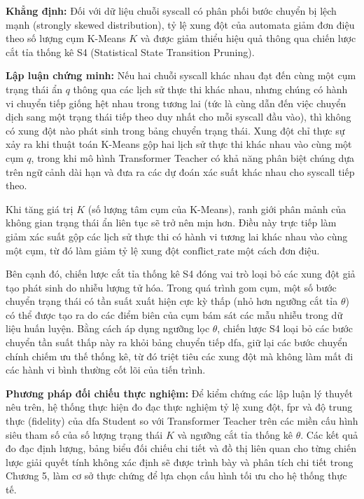 \documentclass[../main.tex]{subfiles}
\begin{document}
\textbf{Khẳng định:} Đối với dữ liệu chuỗi \gls{syscall} có phân phối bước
chuyển bị lệch mạnh (strongly skewed distribution), tỷ lệ xung đột
của automata giảm đơn điệu theo số lượng cụm K-Means $K$ và được giảm
thiểu hiệu quả thông qua chiến lược cắt tỉa thống kê S4 (Statistical
State Transition Pruning).

\textbf{Lập luận chứng minh:} Nếu hai chuỗi \gls{syscall} khác nhau đạt đến
cùng một cụm trạng thái ẩn $q$ thông qua các lịch sử thực thi khác
nhau, nhưng chúng có hành vi chuyển tiếp giống hệt nhau trong tương
lai (tức là cùng dẫn đến việc chuyển dịch sang một trạng thái tiếp
theo duy nhất cho mỗi \gls{syscall} đầu vào), thì không có xung đột nào
phát sinh trong bảng chuyển trạng thái. Xung đột chỉ thực sự xảy ra
khi thuật toán K-Means gộp hai lịch sử thực thi khác nhau vào cùng
một cụm $q$, trong khi mô hình Transformer Teacher có khả năng phân
biệt chúng dựa trên ngữ cảnh dài hạn và đưa ra các dự đoán xác suất
khác nhau cho \gls{syscall} tiếp theo.

Khi tăng giá trị $K$ (số lượng tâm cụm của K-Means), ranh giới phân
mảnh của không gian trạng thái ẩn liên tục sẽ trở nên mịn hơn. Điều
này trực tiếp làm giảm xác suất gộp các lịch sử thực thi có hành vi
tương lai khác nhau vào cùng một cụm, từ đó làm giảm tỷ lệ xung đột
$\text{conflict\_rate}$ một cách đơn điệu.

Bên cạnh đó, chiến lược cắt tỉa thống kê S4 đóng vai trò loại bỏ các
xung đột giả tạo phát sinh do nhiễu lượng tử hóa. Trong quá trình gom
cụm, một số bước chuyển trạng thái có tần suất xuất hiện cực kỳ thấp
(nhỏ hơn ngưỡng cắt tỉa $\theta$) có thể được tạo ra do các điểm biên
của cụm bám sát các mẫu nhiễu trong dữ liệu huấn luyện. Bằng cách áp
dụng ngưỡng lọc $\theta$, chiến lược S4 loại bỏ các bước chuyển tần
suất thấp này ra khỏi bảng chuyển tiếp \gls{dfa}, giữ lại các bước chuyển
chính chiếm ưu thế thống kê, từ đó triệt tiêu các xung đột mà không
làm mất đi các hành vi bình thường cốt lõi của tiến trình.

\textbf{Phương pháp đối chiếu thực nghiệm:} Để kiểm chứng các lập
luận lý thuyết nêu trên, hệ thống thực hiện đo đạc thực nghiệm tỷ lệ
xung đột, \gls{fpr} và độ trung thực (fidelity) của
\gls{dfa} Student so với Transformer Teacher trên các miền cấu hình siêu
tham số của số lượng trạng thái $K$ và ngưỡng cắt tỉa thống kê
$\theta$. Các kết quả đo đạc định lượng, bảng biểu đối chiếu chi tiết
và đồ thị liên quan cho từng chiến lược giải quyết tính không xác
định sẽ được trình bày và phân tích chi tiết trong Chương 5, làm cơ
sở thực chứng để lựa chọn cấu hình tối ưu cho hệ thống thực tế.
\end{document}
